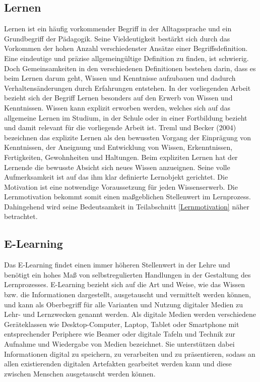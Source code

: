         \subsection{Lernen} \label{Lernen}
            Lernen ist ein häufig vorkommender Begriff in der Alltagssprache und ein Grundbegriff der Pädagogik.
            Seine Vieldeutigkeit bestärkt sich durch das Vorkommen der hohen Anzahl verschiedenster Ansätze einer Begriffsdefinition.
            Eine eindeutige und präzise allgemeingültige Definition zu finden, ist schwierig. \parencite[103]{Treml.2004} 
            Doch Gemeinsamkeiten in den verschiedenen Definitionen bestehen darin, dass es beim Lernen darum geht, Wissen und Kenntnisse aufzubauen
            und dadurch Verhaltensänderungen durch Erfahrungen entstehen. \parencite[19]{marx.2006}
            In der vorliegenden Arbeit bezieht sich der Begriff Lernen besonders auf den Erwerb von Wissen und Kenntnissen.
            Wissen kann explizit erworben werden, welches 
            sich auf das allgemeine Lernen im Studium, in der Schule oder in einer Fortbildung bezieht und damit relevant für die vorliegende Arbeit ist.
            Treml und Becker (2004) bezeichnen das explizite Lernen \glqq als den bewussten Vorgang der Einprägung von Kenntnissen, der Aneignung und Entwicklung von Wissen, Erkenntnissen, Fertigkeiten, Gewohnheiten und Haltungen.\grqq{} \parencite[106]{Treml.2004} 
            Beim expliziten Lernen hat der Lernende die bewusste Absicht sich neues Wissen anzueignen. Seine volle Aufmerksamkeit ist auf das ihm klar definierte Lernobjekt gerichtet. \parencite[215]{RoehrSendlmeier.2016}
            Die Motivation ist eine notwendige Voraussetzung für jeden Wissenserwerb. \parencite[461]{Reinmann.1998} 
            Die Lernmotivation bekommt somit einen maßgeblichen Stellenwert im Lernprozess. Dahingehend wird seine Bedeutsamkeit in Teilabschnitt \ref{Lernmotivation} näher betrachtet.

        \subsection{E-Learning}
            Das E-Learning findet einen immer höheren Stellenwert in der Lehre und benötigt ein hohes Maß von selbstregulierten Handlungen in der Gestaltung des Lernprozesses. \parencite[34]{marx.2006} 
            E-Learning bezieht sich auf die Art und Weise, wie das Wissen bzw. die Informationen dargestellt, ausgetauscht und vermittelt werden können, und kann als 
            Oberbegriff für alle Varianten und Nutzung digitaler Medien zu Lehr- und Lernzwecken genannt werden. Als digitale Medien werden verschiedene Geräteklassen
            wie Desktop-Computer, Laptop, Tablet oder Smartphone mit entsprechender Periphere wie Beamer oder digitale Tafeln und Technik zur Aufnahme und Wiedergabe 
            von Medien bezeichnet. Sie unterstützen dabei Informationen digital zu speichern, zu verarbeiten und zu präsentieren, sodass an allen existierenden digitalen
            Artefakten gearbeitet werden kann und diese zwischen Menschen ausgetauscht werden können. \parencite[6]{Kerres.2013} 

